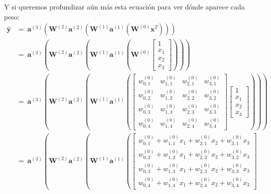 \documentclass[../../main.tex]{subfiles}
\begin{document}
Y si queremos profundizar aún más esta ecuación para ver dónde aparece cada peso:
\begin{align*}
    \bm{\hat{y}}
    &=\ \bm{a}^{(3)} \left(
        \bm{W}^{(2)} \bm{a}^{(2)} \left(
            \bm{W}^{(1)} \bm{a}^{(1)} \left( \bm{W}^{(0)} \bm{x}^T \right)
        \right)
    \right) \\
    &=\ \bm{a}^{(3)} \left(
            \bm{W}^{(2)} \bm{a}^{(2)} \left(
                \bm{W}^{(1)} \bm{a}^{(1)} \left(
                    \bm{W}^{(0)} \begin{bmatrix} 1 \\ x_1 \\ x_2 \\ x_3 \end{bmatrix}
            \right)
        \right)
    \right) \\
    &=\ \bm{a}^{(3)} \left(
            \bm{W}^{(2)} \bm{a}^{(2)} \left(
                \bm{W}^{(1)} \bm{a}^{(1)} \left(
                    \begin{bmatrix}
                        w_{0,1}^{(0)} & w_{1,1}^{(0)} & w_{2,1}^{(0)} & w_{3,1}^{(0)} \\
                        w_{0,2}^{(0)} & w_{1,2}^{(0)} & w_{2,2}^{(0)} & w_{3,2}^{(0)} \\
                        w_{0,3}^{(0)} & w_{1,3}^{(0)} & w_{2,3}^{(0)} & w_{3,3}^{(0)} \\
                        w_{0,4}^{(0)} & w_{1,4}^{(0)} & w_{2,4}^{(0)} & w_{3,4}^{(0)}
                    \end{bmatrix}
                    \begin{bmatrix} 1 \\ x_1 \\ x_2 \\ x_3 \end{bmatrix}
            \right)
        \right)
    \right) \\
    &=\ \bm{a}^{(3)} \left(
            \bm{W}^{(2)} \bm{a}^{(2)} \left(
                \bm{W}^{(1)} \bm{a}^{(1)} \left(
                    \begin{bmatrix}
                        w_{0,1}^{(0)} + w_{1,1}^{(0)} x_1 + w_{2,1}^{(0)} x_2 + w_{3,1}^{(0)} x_3 \\
                        w_{0,2}^{(0)} + w_{1,2}^{(0)} x_1 + w_{2,2}^{(0)} x_2 + w_{3,2}^{(0)} x_3 \\
                        w_{0,3}^{(0)} + w_{1,3}^{(0)} x_1 + w_{2,3}^{(0)} x_2 + w_{3,3}^{(0)} x_3 \\
                        w_{0,4}^{(0)} + w_{1,4}^{(0)} x_1 + w_{2,4}^{(0)} x_2 + w_{3,4}^{(0)} x_3

\end{bmatrix}
\end{align*}
\end{document}
